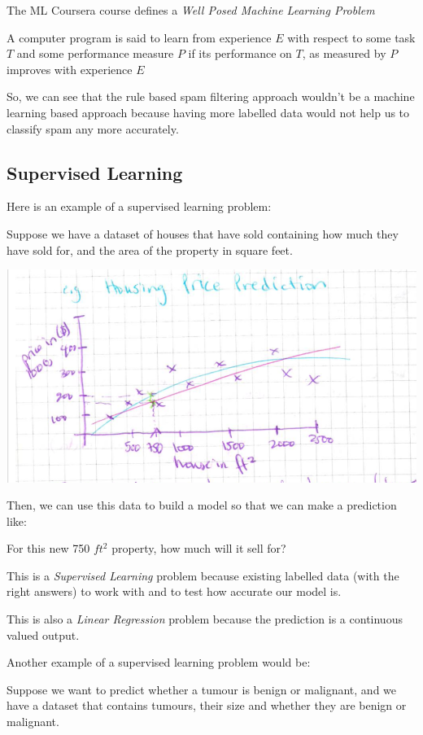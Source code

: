 \documentclass[12pt]{article}
\begin{document}
The ML Coursera course defines a \textit{Well Posed Machine Learning Problem}

A computer program is said to learn from experience $E$ with respect to some task $T$ and some performance measure $P$ 
if its performance on $T$, as measured by $P$ improves with experience $E$

So, we can see that the rule based spam filtering approach wouldn't be a machine learning based approach because having 
more labelled data would not help us to classify spam any more accurately. 

\subsection{Supervised Learning}

Here is an example of a supervised learning problem: 

Suppose we have a dataset of houses that have sold containing how much they have sold for, and the area of the property in square feet. 

\includegraphics[width={\textwidth}]{housing-prices}

Then, we can use this data to build a model so that we can make a prediction like:

For this new 750 $ft^2$ property, how much will it sell for?

This is a \textit{Supervised Learning} problem because existing labelled data (with the right answers) to work with and to test how accurate our model is. 

This is also a \textit{Linear Regression} problem because the prediction is a continuous valued output. 

Another example of a supervised learning problem would be:

Suppose we want to predict whether a tumour is benign or malignant, and we have a dataset that contains tumours, their size and whether they are benign or malignant.
\end{document}
